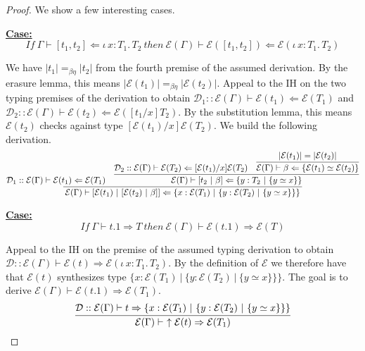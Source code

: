 \documentclass{article}
\newcommand{\abs}[4]{{#1}\, #2\! : \! #3.\, #4}
\newcommand{\tpcheck}[0]{\Leftarrow}
\newcommand{\tpsynth}[0]{\Rightarrow}
\newcommand{\startcase}[1]{\vspace{#1} \noindent\textbf{\underline{Case:}}}
\begin{document}
\begin{proof}
  We show a few interesting cases.

  \startcase{.2cm}
  \[
    \mathit{If}\ \Gamma \vdash [ t_1 , t_2 ] \tpcheck \abs{\iota}{x}{T_1}{T_2}\ 
    \mathit{then}\ \mathcal{E}(\Gamma) \vdash \mathcal{E}([ t_1 , t_2]) \tpcheck
    \mathcal{E}(\abs{\iota}{x}{T_1}{T_2})
  \]

  We have \(|t_1| =_{\beta\eta} |t_2|\) from the fourth premise of the assumed
  derivation.
  By the erasure lemma, this means \(|\mathcal{E}(t_1)| =_{\beta\eta}
  |\mathcal{E}(t_2)|\).
  Appeal to the IH on the two typing premises of the derivation to obtain
  \(\mathcal{D}_1 :: \mathcal{E}(\Gamma) \vdash \mathcal{E}(t_1) \tpcheck
  \mathcal{E}(T_1)\) and
  \(\mathcal{D}_2 :: \mathcal{E}(\Gamma) \vdash \mathcal{E}(t_2) \tpcheck
  \mathcal{E}([t_1/x]T_2)\).
  By the substitution lemma, this means \(\mathcal{E}(t_2)\) checks against type
  \([\mathcal{E}(t_1)/x]\mathcal{E}(T_2)\).
  We build the following derivation.
  \[
    \infer{
      \mathcal{E}(\Gamma) \vdash [ \mathcal{E}(t_1)\ |\ [\mathcal{E}(t_2)\ |\
      \beta ]] \tpcheck \{ x : \mathcal{E}(T_1)\ |\ \{y : \mathcal{E}(T_2)\ |\
      \{y \simeq x\}\}\}
    }{
      \mathcal{D}_1 :: \mathcal{E}(\Gamma) \vdash \mathcal{E}(t_1) \tpcheck
      \mathcal{E}(T_1)
      \quad
      \infer{
        \mathcal{E}(\Gamma) \vdash [ t_2\ |\ \beta ] \tpcheck
        \{ y : T_2\ |\ \{y \simeq x\}\}
      }{
        \mathcal{D}_2 :: \mathcal{E}(\Gamma) \vdash \mathcal{E}(T_2) \tpcheck
        [\mathcal{E}(t_1)/x]\mathcal{E}(T_2)
        \quad
        \infer{
          \mathcal{E}(\Gamma) \vdash \beta \tpcheck \{\mathcal{E}(t_1) \simeq \mathcal{E}(t_2)\}
        }{
          |\mathcal{E}(t_1)| = |\mathcal{E}(t_2)|
        }
      }
    }
  \]
  
  
  \startcase{.2cm}
  \[
    \mathit{If}\ \Gamma \vdash t.1 \tpsynth T\ \mathit{then}\ \mathcal{E}(\Gamma) \vdash
    \mathcal{E}(t.1) \tpsynth \mathcal{E}(T)
  \]

  Appeal to the IH on the premise of
  the assumed typing derivation to obtain \(\mathcal{D} :: \mathcal{E}(\Gamma) \vdash
  \mathcal{E}(t) \tpsynth \mathcal{E}(\abs{\iota}{x}{T_1}{T_2})\).
  By the definition of \(\mathcal{E}\) we therefore have that \(\mathcal{E}(t)\)
  synthesizes type \(\{ x : \mathcal{E}(T_1)\ |\ \{ y : \mathcal{E}(T_2)\ |\ \{
  y \simeq x\}\}\}\).
  The goal is to derive \(\mathcal{E}(\Gamma) \vdash \mathcal{E}(t.1) \tpsynth
  \mathcal{E}(T_1)\).
  \[
    \infer{
      \mathcal{E}(\Gamma) \vdash\ \uparrow \mathcal{E}(t) \tpsynth \mathcal{E}(T_1)
    }{
      \mathcal{D} :: \mathcal{E}(\Gamma) \vdash t \tpsynth
      \{ x : \mathcal{E}(T_1)\ |\ \{ y : \mathcal{E}(T_2)\ |\ \{ y \simeq x \}\}\}
    }
  \]
\end{proof}
\end{document}
